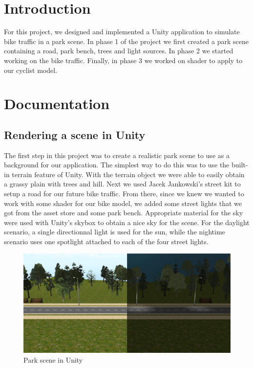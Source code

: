 \documentclass{scrartcl}
\begin{document}

\section{Introduction}

    For this project, we designed and implemented a Unity application to simulate
    bike traffic in a park scene. In phase 1 of the project we first created a park
    scene containing a road, park bench, trees and light sources. In phase 2 we
    started working on the bike traffic. Finally, in phase 3 we worked on shader to
    apply to our cyclist model.
	
\section{Documentation}

    \subsection{Rendering a scene in Unity}
        The first step in this project was to
        create a realistic park scene to use as a background for our application. The
        simplest way to do this was to use the built-in terrain feature of Unity. With
        the terrain object we were able to easily obtain a grassy plain with trees and
        hill. Next we used Jacek Jankowski's street kit\citep{Street:Jankowski} to setup
        a road for our future bike traffic. From there, since we knew we wanted to work
        with some shader for our bike model, we added some street lights that we got
        from the asset store\citep{StreetLight:BiSkiT} and some park
        bench\citep{Parkchair:Universal}. Appropriate material for the sky were used
        with Unity's skybox to obtain a nice sky for the scene. For the daylight
        scenario, a single directionnal light is used for the sun, while the nightime
        scenario uses one spotlight attached to each of the four street lights.
    		
        \begin{figure}[h] 
        \includegraphics[width=\textwidth]{parkDayNight} 
        \caption{Park scene in Unity} 
        \label{fig:park_scene} 
        \end{figure}
		
\end{document}
